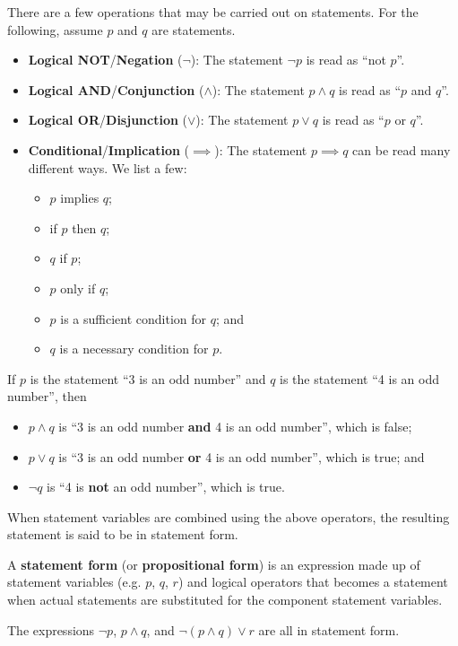 There are a few operations that may be carried out on statements. For the following, assume $p$ and $q$ are statements.
\begin{itemize}
    \item \textbf{Logical NOT}/\textbf{Negation} ($\lnot$): The statement $\lnot p$ is read as ``not $p$''.
    \item \textbf{Logical AND}/\textbf{Conjunction} ($\land$): The statement $p\land q$ is read as ``$p$ and $q$''.
    \item \textbf{Logical OR}/\textbf{Disjunction} ($\lor$): The statement $p\lor q$ is read as ``$p$ or $q$''.
    \item \textbf{Conditional}/\textbf{Implication} ($\implies$): The statement $p \implies q$ can be read many different ways. We list a few:
    \begin{itemize}
        \item $p$ implies $q$;
        \item if $p$ then $q$;
        \item $q$ if $p$;
        \item $p$ only if $q$;
        \item $p$ is a sufficient condition for $q$; and
        \item $q$ is a necessary condition for $p$.
    \end{itemize}
\end{itemize}

\begin{example}
    If $p$ is the statement ``3 is an odd number'' and $q$ is the statement ``4 is an odd number'', then
    \begin{itemize}
        \item $p\land q$ is ``3 is an odd number \textbf{and} 4 is an odd number'', which is false;
        \item $p\lor q$ is ``3 is an odd number \textbf{or} 4 is an odd number'', which is true; and
        \item $\lnot q$ is ``4 is \textbf{not} an odd number'', which is true.
    \end{itemize}
\end{example}

When statement variables are combined using the above operators, the resulting statement is said to be in statement form.
\begin{definition}
    A \textbf{statement form} (or \textbf{propositional form}) is an expression made up of statement variables (e.g. $p$, $q$, $r$) and logical operators that becomes a statement when actual statements are substituted for the component statement variables.
\end{definition}
\begin{example}
    The expressions $\lnot p$, $p \land q$, and $\lnot(p \land q) \lor r$ are all in statement form.
\end{example}


